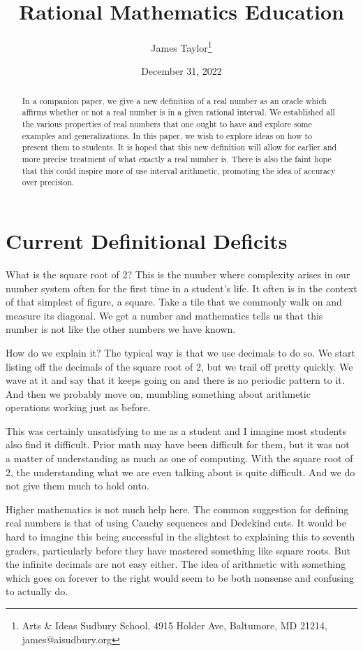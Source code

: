 \documentclass[12pt]{article}
\title{Rational Mathematics Education}
\author{
  James Taylor\footnote{Arts \& Ideas Sudbury School, 4915 Holder Ave, Baltumore, MD 21214, james@aisudbury.org}
}
\date{December 31, 2022}
\theoremstyle{remark}
\begin{document}
\maketitle
\begin{abstract}
In a companion paper, we give a new definition of a real number as an oracle which affirms whether or not a real number is in a given rational interval. We established all the various properties of real numbers that one ought to have and explore some examples and generalizations. In this paper, we wish to explore ideas on how to present them to students. It is hoped that this new definition will allow for earlier and more precise treatment of what exactly a real number is. There is also the faint hope that this could inspire more of use interval arithmetic, promoting the idea of accuracy over precision. 
\end{abstract}

\tableofcontents

\section{Current Definitional Deficits}

What is the square root of 2? This is the number where complexity arises in our number system often for the first time in a student's life. It often is in the context of that simplest of figure, a square. Take a tile that we commonly walk on and measure its diagonal. We get a number and mathematics tells us that this number is not like the other numbers we have known. 

How do we explain it? The typical way is that we use decimals to do so. We start listing off the decimals of the square root of 2, but we trail off pretty quickly. We wave at it and say that it keeps going on and there is no periodic pattern to it. And then we probably move on, mumbling something about arithmetic operations working just as before. 

This was certainly unsatisfying to me as a student and I imagine most students also find it difficult. Prior math may have been difficult for them, but it was not a matter of understanding as much as one of computing. With the square root of 2, the understanding what we are even talking about is quite difficult. And we do not give them much to hold onto. 

Higher mathematics is not much help here. The common suggestion for defining real numbers is that of using Cauchy sequences and Dedekind cuts. It would be hard to imagine this being successful in the slightest to explaining this to seventh graders, particularly before they have mastered something like square roots. But the infinite decimals are not easy either. The idea of arithmetic with something which goes on forever to the right would seem to be both nonsense and confusing to actually do. 
\end{document}

